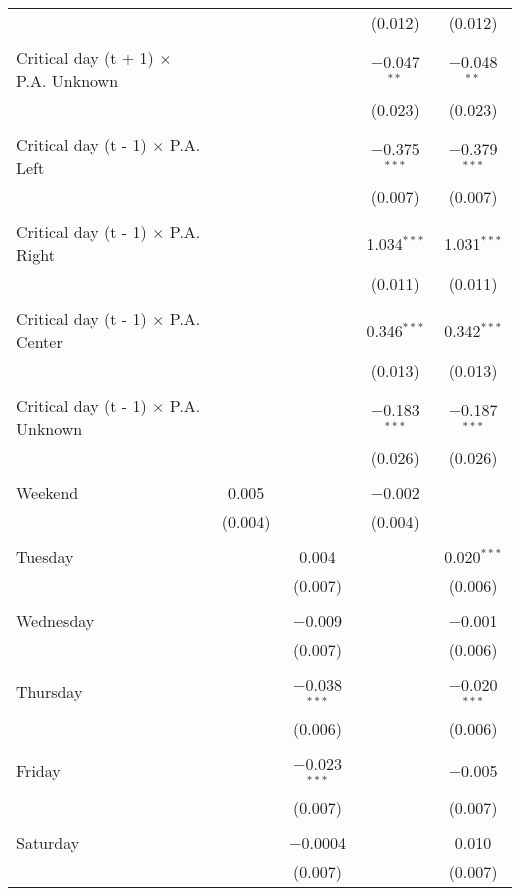 \documentclass[
]{article}
\begin{document}
\begin{table}[!htbp]
{\begin{tabular}{@{\extracolsep{5pt}}lcccc}
  &  &  & (0.012) & (0.012) \\ 
  & & & & \\ 
 Critical day (t + 1) $\times$ P.A. Unknown &  &  & $-$0.047$^{**}$ & $-$0.048$^{**}$ \\ 
  &  &  & (0.023) & (0.023) \\ 
  & & & & \\ 
 Critical day (t - 1) $\times$ P.A. Left &  &  & $-$0.375$^{***}$ & $-$0.379$^{***}$ \\ 
  &  &  & (0.007) & (0.007) \\ 
  & & & & \\ 
 Critical day (t - 1) $\times$ P.A. Right &  &  & 1.034$^{***}$ & 1.031$^{***}$ \\ 
  &  &  & (0.011) & (0.011) \\ 
  & & & & \\ 
 Critical day (t - 1) $\times$ P.A. Center &  &  & 0.346$^{***}$ & 0.342$^{***}$ \\ 
  &  &  & (0.013) & (0.013) \\ 
  & & & & \\ 
 Critical day (t - 1) $\times$ P.A. Unknown &  &  & $-$0.183$^{***}$ & $-$0.187$^{***}$ \\ 
  &  &  & (0.026) & (0.026) \\ 
  & & & & \\ 
 Weekend & 0.005 &  & $-$0.002 &  \\ 
  & (0.004) &  & (0.004) &  \\ 
  & & & & \\ 
 Tuesday &  & 0.004 &  & 0.020$^{***}$ \\ 
  &  & (0.007) &  & (0.006) \\ 
  & & & & \\ 
 Wednesday &  & $-$0.009 &  & $-$0.001 \\ 
  &  & (0.007) &  & (0.006) \\ 
  & & & & \\ 
 Thursday &  & $-$0.038$^{***}$ &  & $-$0.020$^{***}$ \\ 
  &  & (0.006) &  & (0.006) \\ 
  & & & & \\ 
 Friday &  & $-$0.023$^{***}$ &  & $-$0.005 \\ 
  &  & (0.007) &  & (0.007) \\ 
  & & & & \\ 
 Saturday &  & $-$0.0004 &  & 0.010 \\ 
  &  & (0.007) &  & (0.007) \\ 

\end{tabular}}
\end{table}
\end{document}
